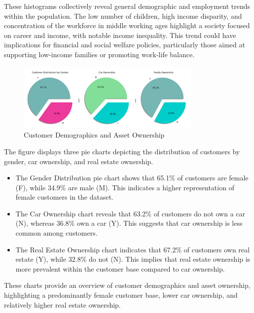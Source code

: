 \documentclass[12pt]{report}
\begin{document}
    These histograms collectively reveal general demographic and employment trends within the population. The low number of children, high income disparity, and concentration of the workforce in middle working ages highlight a society focused on career and income, with notable income inequality. This trend could have implications for financial and social welfare policies, particularly those aimed at supporting low-income families or promoting work-life balance.

    \begin{figure}[h!]
        \centering
        \includegraphics[width=0.8\textwidth]{resources/pic/Customer Demographics and Asset Ownership.png}
        \caption{Customer Demographics and Asset Ownership}
        \label{Customer Demographics and Asset Ownership}
    \end{figure}

    The figure displays three pie charts depicting the distribution of customers by gender, car ownership, and real estate ownership.

    \begin{itemize}
        \item The Gender Distribution pie chart shows that 65.1\% of customers are female (F), while 34.9\% are male (M). This indicates a higher representation of female customers in the dataset.
        \item The Car Ownership chart reveals that 63.2\% of customers do not own a car (N), whereas 36.8\% own a car (Y). This suggests that car ownership is less common among customers.
        \item The Real Estate Ownership chart indicates that 67.2\% of customers own real estate (Y), while 32.8\% do not (N). This implies that real estate ownership is more prevalent within the customer base compared to car ownership.
    \end{itemize}

    These charts provide an overview of customer demographics and asset ownership, highlighting a predominantly female customer base, lower car ownership, and relatively higher real estate ownership.
\end{document}
